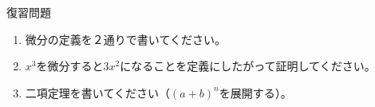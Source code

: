 \documentclass[12pt,a4paper]{jsarticle}
\begin{document}
復習問題
\begin{enumerate}
    \item 微分の定義を２通りで書いてください。
    \item $x^3$を微分すると$3x^2$になることを定義にしたがって証明してください。
    \item 二項定理を書いてください（$\left( a+b \right) ^n$を展開する）。
\end{enumerate}
\end{document}
